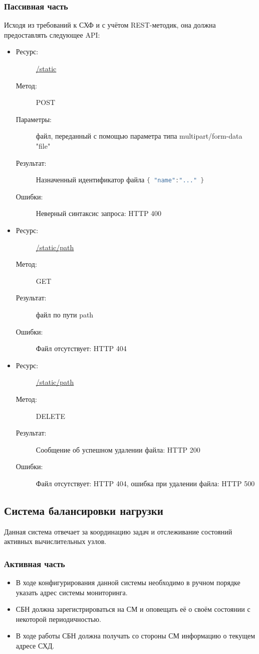 \documentclass[a4paper,12pt]{report}
\numberwithin{equation}{section}
\begin{document}
  \subsubsection{Пассивная часть}
  Исходя из требований к СХФ и с учётом REST-методик, она должна предоставлять следующее API:
  
  \begin{itemize}
    \item
    \begin{description}
      \item[Ресурс:] \url{/static}
      \item[Метод:] POST
      \item[Параметры:] файл, переданный с помощью параметра типа multipart/form-data "file"
      \item[Результат:] Назначенный идентификатор файла
      \lstinline[language=Java]|{ "name":"..." }|
      \item[Ошибки:] Неверный синтаксис запроса: HTTP 400
    \end{description}
    \item
    \begin{description}
      \item[Ресурс:] \url{/static/path}
      \item[Метод:] GET
      \item[Результат:] файл по пути path
      \item[Ошибки:] Файл отсутствует: HTTP 404
    \end{description}
    \item
    \begin{description}
      \item[Ресурс:] \url{/static/path}
      \item[Метод:] DELETE
      \item[Результат:] Сообщение об успешном удалении файла: HTTP 200
      \item[Ошибки:] Файл отсутствует: HTTP 404, ошибка при удалении файла: HTTP 500
    \end{description}
  \end{itemize}
    
  \subsection{Система балансировки нагрузки}
  Данная система отвечает за координацию задач и отслеживание состояний активных вычислительных узлов. 
  
  \subsubsection{Активная часть}
  \begin{itemize}
    \item В ходе конфигурирования данной системы необходимо в ручном порядке указать адрес системы мониторинга.
    \item СБН должна зарегистрироваться на СМ и оповещать её о своём состоянии с некоторой периодичностью.
    \item В ходе работы СБН должна получать со стороны СМ информацию о текущем адресе СХД.
  \end{itemize}
  
\end{document}
